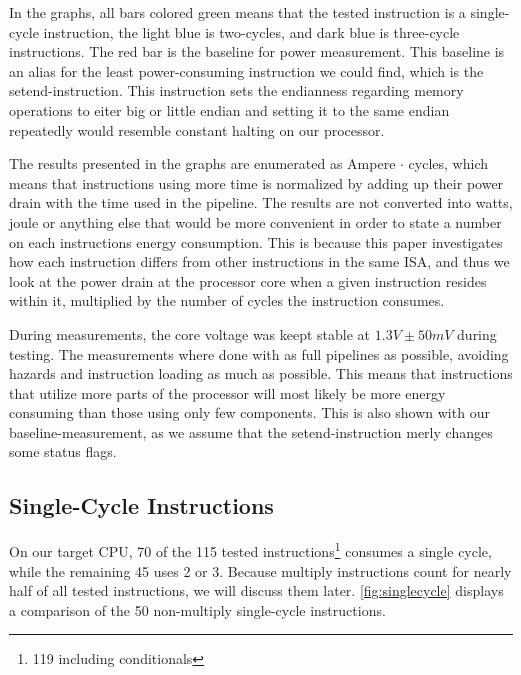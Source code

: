 In the graphs, all bars colored green means that the tested instruction is a
single-cycle instruction, the light blue is two-cycles, and dark blue is
three-cycle instructions. The red bar is the baseline for power measurement.
This baseline is an alias for the least power-consuming instruction we could
find, which is the {\ttfamily setend}-instruction. This instruction sets the
endianness regarding memory operations to eiter big or little
endian \cite{armcompilerref} and setting it to the same endian repeatedly would
resemble constant halting on our processor.

The results presented in the graphs are enumerated as Ampere
$\cdot$ cycles, which means that instructions using more time is normalized by
adding up their power drain with the time used in the pipeline. The results are
not converted into watts, joule or anything else that would be more convenient
in order to state a number on each instructions energy consumption. This is
because this paper investigates how each instruction differs from other
instructions in the same ISA, and thus we look at the power drain at the
processor core when a given instruction resides within it, multiplied by the
number of cycles the instruction consumes. 

During measurements, the core voltage was keept stable at
$1.3V\pm50mV$ during testing. The measurements where done with as full
pipelines as possible, avoiding hazards and instruction loading as much as
possible. This means that instructions that utilize more parts of the processor
will most likely be more energy consuming than those using only few components.
This is also shown with our {\ttfamily baseline}-measurement, as we assume that
the {\ttfamily setend}-instruction merly changes some status flags.




\subsection{Single-Cycle Instructions}
On our target CPU, 70 of the 115 tested instructions\footnote{119 including
conditionals} consumes a single cycle, while the remaining 45 uses 2 or 3.
Because multiply instructions count for nearly half of all tested instructions,
we will discuss them later.
\autoref{fig:singlecycle} displays a comparison of the 50 non-multiply
single-cycle instructions.

